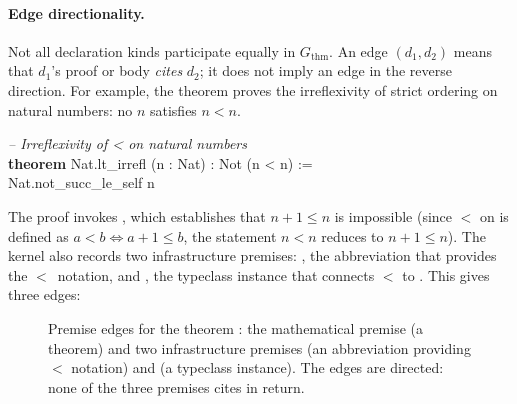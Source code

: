 \paragraph{Edge directionality.}
Not all declaration kinds participate equally in $G_{\mathrm{thm}}$. An edge $(d_1, d_2)$ means that $d_1$'s proof or body \emph{cites} $d_2$; it does not imply an edge in the reverse direction. For example, the theorem  proves the irreflexivity of strict ordering on natural numbers: no $n$ satisfies $n < n$.

\begin{codebox}
\textit{\color{gray}-- Irreflexivity of < on natural numbers}\\
\textbf{theorem} \textcolor{red!70!black}{Nat.lt\_irrefl} (n : Nat) : Not (n < n) :=\\
\hspace{1.5em}\textcolor{red!70!black}{Nat.not\_succ\_le\_self} n
\end{codebox}

\noindent
The proof invokes , which establishes that $n + 1 \le n$ is impossible (since $<$ on  is defined as $a < b \iff a + 1 \le b$, the statement $n < n$ reduces to $n + 1 \le n$). The kernel also records two infrastructure premises: , the abbreviation that provides the $<$~notation, and , the typeclass instance that connects $<$ to . This gives three edges:

\begin{figure}[H]
\centering
{}
\caption{Premise edges for the theorem : the mathematical premise  (a theorem) and two infrastructure premises  (an abbreviation providing $<$ notation) and  (a typeclass instance). The edges are directed: none of the three premises cites  in return.}
\label{fig:thm-single-edge}
\end{figure}

